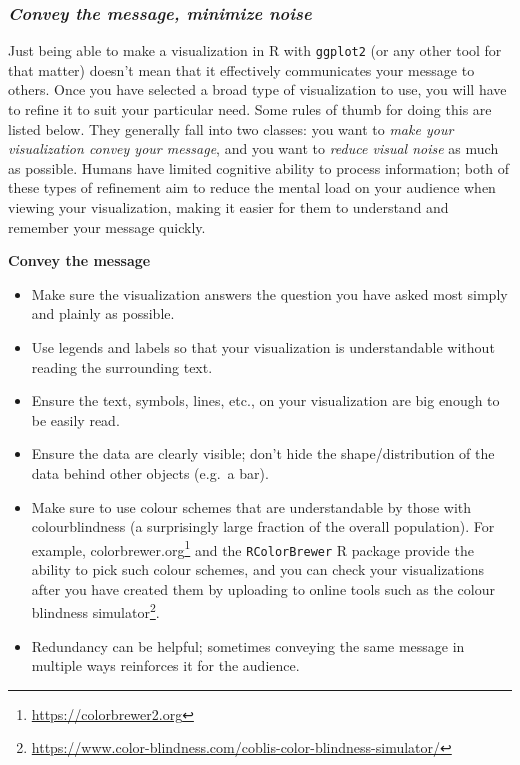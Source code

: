 \documentclass[
]{krantz}
\providecommand{\tightlist}{%
  \setlength{\itemsep}{0pt}\setlength{\parskip}{0pt}}
\renewcommand{\href}[2]{#2\footnote{\url{#1}}}
\begin{document}
\hypertarget{convey-the-message-minimize-noise}{%
\subsubsection{\texorpdfstring{\emph{Convey the message, minimize noise}}{Convey the message, minimize noise}}\label{convey-the-message-minimize-noise}}

Just being able to make a visualization in R with \texttt{ggplot2} (or any other tool for that matter) doesn't mean that it effectively communicates your message to others. Once you have selected a broad type of visualization to use, you will have to refine it to suit your particular need.
Some rules of thumb for doing this are listed below. They generally fall into two classes: you want to \emph{make your
visualization convey your message}, and you want to \emph{reduce visual noise} as much as possible. Humans have limited cognitive ability
to process information; both of these types of refinement aim to reduce the mental load on your audience when viewing your visualization,
making it easier for them to understand and remember your message quickly.

\textbf{Convey the message}

\begin{itemize}
\tightlist
\item
  Make sure the visualization answers the question you have asked most simply and plainly as possible.
\item
  Use legends and labels so that your visualization is understandable without reading the surrounding text.
\item
  Ensure the text, symbols, lines, etc., on your visualization are big enough to be easily read.
\item
  Ensure the data are clearly visible; don't hide the shape/distribution of the data behind other objects (e.g.~a bar).
\item
  Make sure to use colour schemes that are understandable by those with colourblindness (a surprisingly large fraction of the
  overall population). For example, \href{https://colorbrewer2.org}{colorbrewer.org}
  and the \texttt{RColorBrewer} R package provide the ability to pick such colour schemes, and you can check your visualizations after
  you have created them by uploading to online tools such as the \href{https://www.color-blindness.com/coblis-color-blindness-simulator/}{colour blindness simulator}.
\item
  Redundancy can be helpful; sometimes conveying the same message in multiple ways reinforces it for the audience.
\end{itemize}
\end{document}
